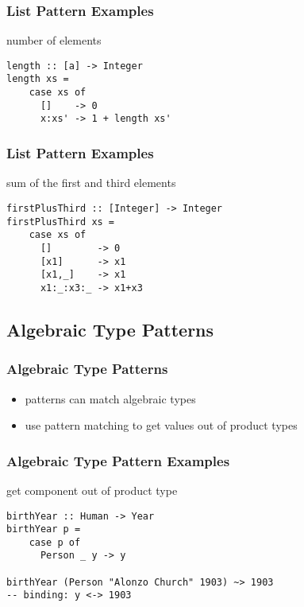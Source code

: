 \documentclass[dvipsnames]{beamer}
\theoremstyle{plain}
\begin{document}
\begin{frame}[fragile]
  \frametitle{List Pattern Examples}

  \begin{exampleblock}{number of elements}
    \begin{lstlisting}
length :: [a] -> Integer
length xs =
    case xs of
      []    -> 0
      x:xs' -> 1 + length xs'
    \end{lstlisting}
  \end{exampleblock}
\end{frame}

\begin{frame}[fragile]
  \frametitle{List Pattern Examples}

  \begin{exampleblock}{sum of the first and third elements}
    \begin{lstlisting}
firstPlusThird :: [Integer] -> Integer
firstPlusThird xs =
    case xs of
      []        -> 0
      [x1]      -> x1
      [x1,_]    -> x1
      x1:_:x3:_ -> x1+x3
    \end{lstlisting}
  \end{exampleblock}
\end{frame}

\subsection{Algebraic Type Patterns}

\begin{frame}
  \frametitle{Algebraic Type Patterns}

  \begin{itemize}
    \item patterns can match algebraic types
    \item use pattern matching to get values out of product types
  \end{itemize}
\end{frame}

\begin{frame}[fragile]
  \frametitle{Algebraic Type Pattern Examples}

  \begin{exampleblock}{get component out of product type}
    \begin{lstlisting}
birthYear :: Human -> Year
birthYear p =
    case p of
      Person _ y -> y

birthYear (Person "Alonzo Church" 1903) ~> 1903
-- binding: y <-> 1903
    \end{lstlisting}
  \end{exampleblock}
\end{frame}
\end{document}
